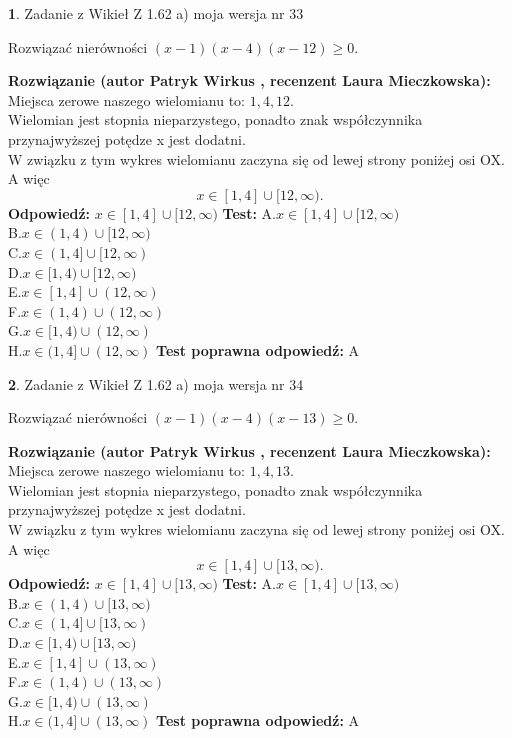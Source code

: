 \documentclass[12pt, a4paper]{article}
\theoremstyle{definition} %
\newtheorem{zad}{}
\newcommand{\zadStart}[1]{\begin{zad}#1\newline}
\newcommand{\zadStop}{\end{zad}}
\newcommand{\rozwStart}[2]{\noindent \textbf{Rozwiązanie (autor #1 , recenzent #2): }\newline}
\newcommand{\rozwStop}{\newline}
\newcommand{\odpStart}{\noindent \textbf{Odpowiedź:}\newline}
\newcommand{\odpStop}{\newline}
\newcommand{\testStart}{\noindent \textbf{Test:}\newline}
\newcommand{\testStop}{\newline}
\newcommand{\kluczStart}{\noindent \textbf{Test poprawna odpowiedź:}\newline}
\newcommand{\kluczStop}{\newline}
\begin{document}
\zadStart{Zadanie z Wikieł Z 1.62 a) moja wersja nr 33}

Rozwiązać nierówności $(x-1)(x-4)(x-12)\ge0$.
\zadStop
\rozwStart{Patryk Wirkus}{Laura Mieczkowska}
Miejsca zerowe naszego wielomianu to: $1, 4, 12$.\\
Wielomian jest stopnia nieparzystego, ponadto znak współczynnika przy\linebreak najwyższej potędze x jest dodatni.\\ W związku z tym wykres wielomianu zaczyna się od lewej strony poniżej osi OX. A więc $$x \in [1,4] \cup [12,\infty).$$
\rozwStop
\odpStart
$x \in [1,4] \cup [12,\infty)$
\odpStop
\testStart
A.$x \in [1,4] \cup [12,\infty)$\\
B.$x \in (1,4) \cup [12,\infty)$\\
C.$x \in (1,4] \cup [12,\infty)$\\
D.$x \in [1,4) \cup [12,\infty)$\\
E.$x \in [1,4] \cup (12,\infty)$\\
F.$x \in (1,4) \cup (12,\infty)$\\
G.$x \in [1,4) \cup (12,\infty)$\\
H.$x \in (1,4] \cup (12,\infty)$
\testStop
\kluczStart
A
\kluczStop



\zadStart{Zadanie z Wikieł Z 1.62 a) moja wersja nr 34}

Rozwiązać nierówności $(x-1)(x-4)(x-13)\ge0$.
\zadStop
\rozwStart{Patryk Wirkus}{Laura Mieczkowska}
Miejsca zerowe naszego wielomianu to: $1, 4, 13$.\\
Wielomian jest stopnia nieparzystego, ponadto znak współczynnika przy\linebreak najwyższej potędze x jest dodatni.\\ W związku z tym wykres wielomianu zaczyna się od lewej strony poniżej osi OX. A więc $$x \in [1,4] \cup [13,\infty).$$
\rozwStop
\odpStart
$x \in [1,4] \cup [13,\infty)$
\odpStop
\testStart
A.$x \in [1,4] \cup [13,\infty)$\\
B.$x \in (1,4) \cup [13,\infty)$\\
C.$x \in (1,4] \cup [13,\infty)$\\
D.$x \in [1,4) \cup [13,\infty)$\\
E.$x \in [1,4] \cup (13,\infty)$\\
F.$x \in (1,4) \cup (13,\infty)$\\
G.$x \in [1,4) \cup (13,\infty)$\\
H.$x \in (1,4] \cup (13,\infty)$
\testStop
\kluczStart
A
\kluczStop
\end{document}
